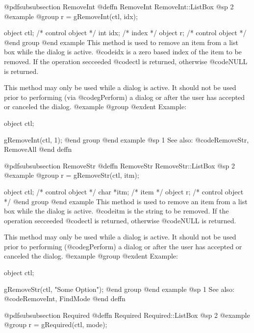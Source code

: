 @pdfsubsubsection {RemoveInt}
@deffn {RemoveInt} RemoveInt::ListBox
@sp 2
@example
@group
r = gRemoveInt(ctl, idx);

object  ctl;    /*  control object  */
int     idx;    /*  index           */
object  r;      /*  control object  */
@end group
@end example
This method is used to remove an item from a list box while the dialog
is active.  @code{idx} is a zero based index of the item to be removed.
If the operation secceeded @code{ctl} is returned, otherwise @code{NULL}
is returned.

This method may only be used while a dialog is active.  It should not be
used prior to performing (via @code{gPerform}) a dialog or after the user
has accepted or canceled the dialog.
@example
@group
@exdent Example:

object  ctl;

gRemoveInt(ctl, 1);
@end group
@end example
@sp 1
See also:  @code{RemoveStr, RemoveAll}
@end deffn














@pdfsubsubsection {RemoveStr}
@deffn {RemoveStr} RemoveStr::ListBox
@sp 2
@example
@group
r = gRemoveStr(ctl, itm);

object  ctl;    /*  control object  */
char   *itm;    /*  item            */
object  r;      /*  control object  */
@end group
@end example
This method is used to remove an item from a list box while the dialog
is active.  @code{itm} is the string to be removed.
If the operation secceeded @code{ctl} is returned, otherwise @code{NULL}
is returned.

This method may only be used while a dialog is active.  It should not be
used prior to performing (@code{gPerform}) a dialog or after the user
has accepted or canceled the dialog.
@example
@group
@exdent Example:

object  ctl;

gRemoveStr(ctl, "Some Option");
@end group
@end example
@sp 1
See also:  @code{RemoveInt, FindMode}
@end deffn















@pdfsubsubsection {Required}
@deffn {Required} Required::ListBox
@sp 2
@example
@group
r = gRequired(ctl, mode);

